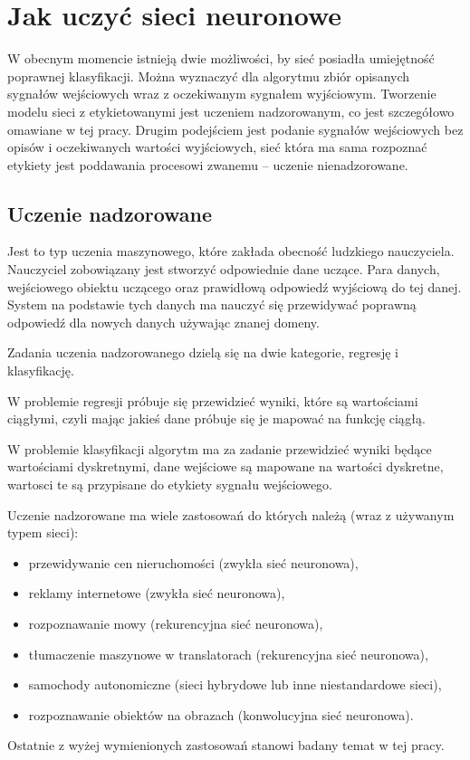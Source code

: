 \documentclass[12pt,a4paper,twoside,titlepage,openright]{book}
\begin{document}
\section{Jak uczyć sieci neuronowe}
W obecnym momencie istnieją dwie możliwości, by sieć posiadła umiejętność poprawnej klasyfikacji. Można wyznaczyć dla algorytmu zbiór opisanych sygnałów wejściowych wraz z oczekiwanym sygnałem wyjściowym. Tworzenie modelu sieci z etykietowanymi jest uczeniem nadzorowanym, co jest szczegółowo omawiane w tej pracy. Drugim podejściem jest podanie sygnałów wejściowych bez opisów i oczekiwanych wartości wyjściowych, sieć która ma sama rozpoznać etykiety jest poddawania procesowi zwanemu -- uczenie nienadzorowane.

\subsection*{Uczenie nadzorowane}
Jest to typ uczenia maszynowego, które zakłada obecność ludzkiego nauczyciela. Nauczyciel zobowiązany jest stworzyć odpowiednie dane uczące. Para danych, wejściowego obiektu uczącego oraz prawidłową odpowiedź wyjściową do tej danej. System na podstawie tych danych ma nauczyć się przewidywać poprawną odpowiedź dla nowych danych używając znanej domeny.

Zadania uczenia nadzorowanego dzielą się na dwie kategorie, regresję i klasyfikację. 

W problemie regresji próbuje się przewidzieć wyniki, które są wartościami ciągłymi, czyli mając jakieś dane próbuje się je mapować na funkcję ciągłą. 

W problemie klasyfikacji algorytm ma za zadanie przewidzieć wyniki będące wartościami dyskretnymi, dane wejściowe są mapowane na wartości dyskretne, wartosci te są przypisane do etykiety sygnału wejściowego.\cite{Gron:2017:HML:3153997}

Uczenie nadzorowane ma wiele zastosowań do których należą (wraz z używanym typem sieci):
\begin{itemize}
\item przewidywanie cen nieruchomości (zwykła sieć neuronowa),
\item reklamy internetowe (zwykła sieć neuronowa),
\item rozpoznawanie mowy (rekurencyjna sieć neuronowa),
\item tłumaczenie maszynowe w translatorach (rekurencyjna sieć neuronowa),
\item samochody autonomiczne (sieci hybrydowe lub inne niestandardowe sieci),
\item rozpoznawanie obiektów na obrazach (konwolucyjna sieć neuronowa).
\end{itemize}
Ostatnie z wyżej wymienionych zastosowań stanowi badany temat w tej pracy.
\end{document}
